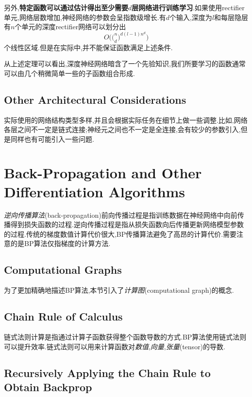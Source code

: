 另外,\textbf{特定函数可以通过估计得出至少需要$d$层网络进行训练学习}.如果使用rectifier单元,网络层数增加,神经网络的参数会呈指数级增长.有$d$个输入,深度为$l$和每层隐层有$n$个单元的深度rectifier网络可以划分出
\begin{equation}
O\Big(\big(^n_d\big)^{d(l-1)n^d}\Big)
\end{equation}
个线性区域.但是在实际中,并不能保证函数满足上述条件.

从上述定理可以看出,深度神经网络暗含了一个先验知识,我们所要学习的函数通常可以由几个稍微简单一些的子函数组合形成.

\subsection{Other Architectural Considerations}

实际使用的网络结构类型多样,并且会根据实际任务在细节上做一些调整.比如,网络各层之间不一定是链式连接;神经元之间也不一定是全连接,会有较少的参数引入,但是同样也有可能引入一些问题.

\section{Back-Propagation and Other Differentiation Algorithms}

\textit{逆向传播算法}(back-propagation)前向传播过程是指训练数据在神经网络中向前传播得到损失函数的过程.逆向传播过程是指从损失函数向后传播更新网络模型参数的过程.传统的梯度数值计算代价很大,BP传播算法避免了高昂的计算代价.需要注意的是BP算法仅指梯度的计算方法.

\subsection{Computational Graphs}

为了更加精确地描述BP算法,本节引入了\textit{计算图}(computational graph)的概念.

\subsection{Chain Rule of Calculus}

链式法则计算是指通过计算子函数获得整个函数导数的方式.BP算法使用链式法则可以提升效率.链式法则可以用来计算函数对\textit{数值},\textit{向量},\textit{张量}(tensor)的导数.

\subsection{Recursively Applying the Chain Rule to Obtain Backprop}

